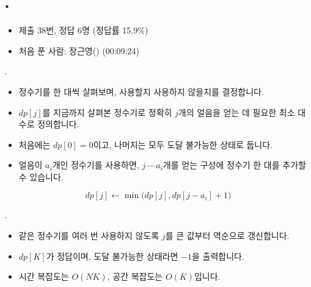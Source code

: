 
\section{\texorpdfstring{\pletter. \ptitle}{문제 \pletter}}

\begin{frame}[label=problem-E]
    \sectiontitle{\pletter}{\ptitle}
    \begin{itemize}
        \item 제출 38번, 정답 6명 (정답률 15.9\%)
        \item 처음 푼 사람: 장근영() (00:09:24)
    \end{itemize}
\end{frame}

\begin{frame}{\textbf{\pletter}. \ptitle}
\begin{itemize}
    \item 정수기를 한 대씩 살펴보며, 사용할지 사용하지 않을지를 결정합니다.
    \item $dp[j]$를 지금까지 살펴본 정수기로 정확히 $j$개의 얼음을 얻는 데 필요한 최소 대수로 정의합니다.
    \item 처음에는 $dp[0]=0$이고, 나머지는 모두 도달 불가능한 상태로 둡니다.
    \item 얼음이 $a_i$개인 정수기를 사용하면, $j-a_i$개를 얻는 구성에 정수기 한 대를 추가할 수 있습니다.
\end{itemize}
\[
    dp[j]\leftarrow\min\bigl(dp[j],dp[j-a_i]+1\bigr)
\]
\end{frame}

\begin{frame}{\textbf{\pletter}. \ptitle}
\begin{itemize}
    \item 같은 정수기를 여러 번 사용하지 않도록 $j$를 큰 값부터 역순으로 갱신합니다.
    \item $dp[K]$가 정답이며, 도달 불가능한 상태라면 $-1$을 출력합니다.
    \item 시간 복잡도는 $O(NK)$, 공간 복잡도는 $O(K)$입니다.
\end{itemize}
\end{frame}
